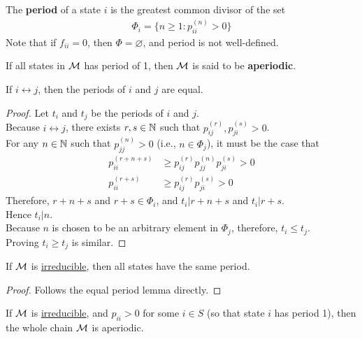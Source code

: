 \documentclass{article}
\newcommand{\upn}[0]{^{(n)}}
\begin{document}
	\begin{definition}
		The \textbf{period} of a state $i$ is the greatest common divisor of the set
		\begin{align}
			\Phi_i = \{n \geq 1: p_{ii}\upn > 0\}
		\end{align}
		Note that if $f_{ii} = 0$, then $\Phi = \varnothing$, and period is not well-defined.
	\end{definition}
	
	\begin{definition}
		If all states in $\mathcal{{M}}$ has period of 1, then $\mathcal{{M}}$ is said to be \textbf{aperiodic}.
	\end{definition}
	
	\begin{lemma}
		If $i \leftrightarrow j$, then the periods of $i$ and $j$ are equal.
	\end{lemma}
	
	\begin{proof}
		Let $t_i$ and $t_j$ be the periods of $i$ and $j$. \\
		Because $i \leftrightarrow j$, there exists $r, s \in \mathbb{N}$ such that $p_{ij}^{(r)}, p_{ji}^{(s)} > 0$. \\
		For any $n \in \mathbb{N}$ such that $p_{jj}\upn > 0$ (i.e., $n \in \Phi_j$), it must be the case that
		\begin{align}
			p^{(r+n+s)}_{ii} &\geq p_{ij}^{(r)} p_{jj}\upn p_{ji}^{(s)} > 0 \\
			p^{(r+s)}_{ii} &\geq p_{ij}^{(r)} p_{ji}^{(s)} > 0
		\end{align}
		Therefore, $r+n+s$ and $r + s \in \Phi_i$, and $t_i | r + n + s$ and $t_i | r + s$. \\
		Hence $t_i | n$. \\
		Because $n$ is chosen to be an arbitrary element in $\Phi_j$, therefore, $t_i \leq t_j$. \\
		Proving $t_i \geq t_j$ is similar. 
	\end{proof}
	
	\begin{corollary}
		If $\mathcal{{M}}$ is \ul{irreducible}, then all states have the same period.
	\end{corollary}
	\begin{proof}
		Follows the equal period lemma directly.
	\end{proof}
	
	\begin{corollary}
		If $\mathcal{{M}}$ is \ul{irreducible}, and $p_{ii} > 0$ for some $i \in S$ (so that state $i$ has period 1), then the whole chain $\mathcal{{M}}$ is aperiodic.
	\end{corollary}
\end{document}
